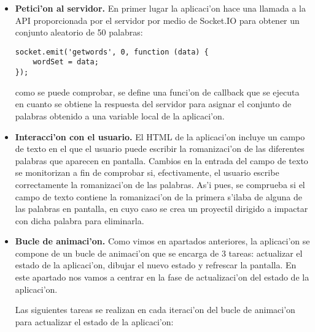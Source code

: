\begin{itemize}
\item \textbf{Petici'on al servidor.} En primer lugar la aplicaci'on hace una llamada a la API proporcionada por el servidor
por medio de Socket.IO para obtener un conjunto aleatorio de 50 palabras:

\begin{verbatim}
socket.emit('getwords', 0, function (data) {
    wordSet = data;
});
\end{verbatim}

como se puede comprobar, se define una funci'on de callback que se ejecuta en cuanto se obtiene la respuesta del
servidor para asignar el conjunto de palabras obtenido a una variable local de la aplicaci'on.
\item \textbf{Interacci'on con el usuario.} El HTML de la aplicaci'on incluye un campo de texto en el que el usuario puede 
escribir la romanizaci'on de las diferentes palabras que aparecen en pantalla. Cambios en la entrada del campo de 
texto se monitorizan a fin de comprobar si, efectivamente, el usuario escribe correctamente la romanizaci'on de las
palabras.
As'i pues, se comprueba si el campo de texto contiene la romanizaci'on de la primera s'ilaba de alguna de las
palabras en pantalla, en cuyo caso se crea un proyectil dirigido a impactar con dicha palabra para eliminarla.
\item \textbf{Bucle de animaci'on.} Como vimos en apartados anteriores, la aplicaci'on se compone de un bucle de animaci'on 
que se encarga de 3 tareas: actualizar el estado de la aplicaci'on, dibujar el nuevo estado y refrescar la pantalla.
En este apartado nos vamos a centrar en la fase de actualizaci'on del estado de la aplicaci'on.

Las siguientes tareas se realizan en cada iteraci'on del bucle de animaci'on para actualizar el estado de la 
aplicaci'on:


\end{itemize}
